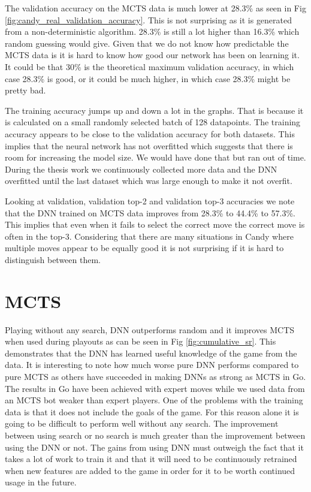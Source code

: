 \documentclass{kththesis}
\begin{document}
The validation accuracy on the MCTS data is much lower at 28.3\% as seen in Fig \ref{fig:candy_real_validation_accuracy}. This is not surprising as  it is generated from a non-deterministic algorithm. 28.3\% is still a lot higher than 16.3\% which random guessing would give. Given that we do not know how predictable the MCTS data is it is hard to know how good our network has been on learning it. It could be that 30\% is the theoretical maximum validation accuracy, in which case 28.3\% is good, or it could be much higher, in which case 28.3\% might be pretty bad. 

The training accuracy jumps up and down a lot in the  graphs. That is because  it is calculated on a small randomly selected batch  of 128 datapoints. The training accuracy appears to be close to the validation accuracy for both datasets. This  implies that the neural network has not overfitted which suggests that there is room for increasing the model size. We would have done that but ran out of time.  During the thesis work we continuously collected  more data and the DNN overfitted until the last dataset which was  large enough to make it not overfit. 

Looking at validation, validation top-2 and validation top-3 accuracies we note that the DNN trained on MCTS data improves from 28.3\% to 44.4\% to 57.3\%. This implies that even when it fails to select the correct move the correct move is often in the top-3. Considering that there are many situations in Candy where multiple moves appear to be equally good it is not surprising if it is hard to distinguish between them. 

\section{MCTS}
Playing without any search, DNN outperforms random and it improves MCTS when used during playouts as can be seen in Fig \ref{fig:cumulative_sr}. This demonstrates  that the DNN has learned useful knowledge of the game from the data. It is interesting to note how much worse pure DNN performs compared to pure MCTS as others have succeeded in making DNNs as strong as MCTS in Go. The results in Go have been achieved with expert moves while we used data from an MCTS bot weaker than expert players. One of the problems with the training data is that it does not include the goals of the game. For this reason alone it is going to be difficult to perform well without any search. The improvement between using search or no search is much greater than the improvement between using the DNN or not. The gains from using DNN must outweigh the fact that it takes a lot of work to train it and that it will need to be continuously retrained when new features are added to the game in order for it to be worth continued usage in the future.
\end{document}

